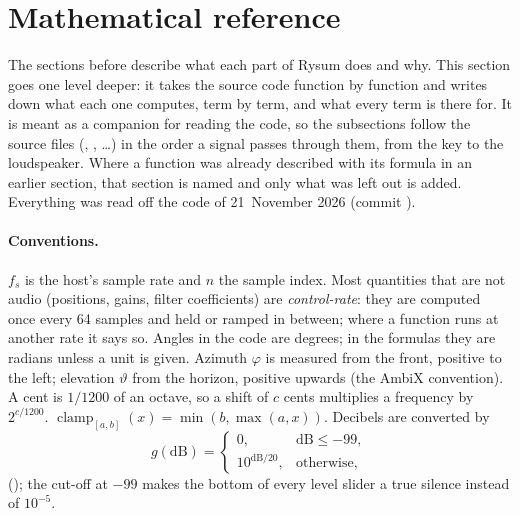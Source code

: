 \section{Mathematical reference}
\label{sec:math}

The sections before describe what each part of Rysum does and why. This section goes one level deeper: it takes the
source code function by function and writes down what each one computes, term by term, and what every term is there for.
It is meant as a companion for reading the code, so the subsections follow the source files (,
, \dots) in the order a signal passes through them, from the key to the loudspeaker. Where a function was
already described with its formula in an earlier section, that section is named and only what was left out is added.
Everything was read off the code of 21~November 2026 (commit ).

\paragraph{Conventions.} $f_s$ is the host's sample rate and $n$ the sample index. Most quantities that are not audio
(positions, gains, filter coefficients) are \emph{control-rate}: they are computed once every 64 samples and held or
ramped in between; where a function runs at another rate it says so. Angles in the code are degrees; in the formulas
they are radians unless a unit is given. Azimuth $\varphi$ is measured from the front, positive to the left;
elevation $\vartheta$ from the horizon, positive upwards (the AmbiX convention). A cent is $1/1200$ of an octave, so a
shift of $c$ cents multiplies a frequency by $2^{c/1200}$. $\operatorname{clamp}_{[a,b]}(x)=\min(b,\max(a,x))$.
Decibels are converted by
\begin{equation}
  g(\mathrm{dB}) = \begin{cases} 0, & \mathrm{dB}\le -99,\\ 10^{\mathrm{dB}/20}, & \text{otherwise,}\end{cases}
\end{equation}
(); the cut-off at $-99$ makes the bottom of every level slider a true silence instead of
$10^{-5}$.

